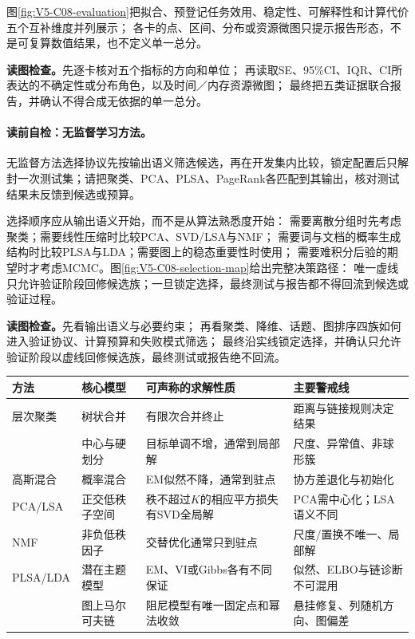 图\ref{fig:V5-C08-evaluation}把拟合、预登记任务效用、稳定性、可解释性和计算代价五个互补维度并列展示；
各卡的点、区间、分布或资源微图只提示报告形态，不是可复算数值结果，也不定义单一总分。

\FloatBarrier
\noindent\textbf{读图检查。}先逐卡核对五个指标的方向和单位；
再读取SE、95\%CI、IQR、CI所表达的不确定性或分布角色，以及时间／内存资源微图；
最终把五类证据联合报告，并确认不得合成无依据的单一总分。

\paragraph{读前自检：无监督学习方法。}无监督方法选择协议先按输出语义筛选候选，再在开发集内比较，锁定配置后只解封一次测试集；请把聚类、PCA、PLSA、PageRank各匹配到其输出，核对测试结果未反馈到候选或预算。\par


选择顺序应从输出语义开始，而不是从算法熟悉度开始：
需要离散分组时先考虑聚类；需要线性压缩时比较PCA、SVD/LSA与NMF；
需要词与文档的概率生成结构时比较PLSA与LDA；需要图上的稳态重要性时使用\PageRank{}；
需要难积分后验的期望时才考虑MCMC。图\ref{fig:V5-C08-selection-map}给出完整决策路径：
唯一虚线只允许验证阶段回修候选族；一旦锁定选择，最终测试与报告都不得回流到候选或验证过程。

\FloatBarrier
\noindent\textbf{读图检查。}先看输出语义与必要约束；
再看聚类、降维、话题、图排序四族如何进入验证协议、计算预算和失败模式筛选；
最终沿实线锁定选择，并确认只允许验证阶段以虚线回修候选族，最终测试或报告绝不回流。

\begin{center}
\small
\begin{tabularx}{\textwidth}{@{}p{}p{}Xp{}@{}}
\toprule
方法 & 核心模型 & 可声称的求解性质 & 主要警戒线 \\
\midrule
层次聚类 & 树状合并 & 有限次合并终止 & 距离与链接规则决定结果 \\
\kMeans{} & 中心与硬划分 & 目标单调不增，通常到局部解 & 尺度、异常值、非球形簇 \\
高斯混合 & 概率混合 & EM似然不降，通常到驻点 & 协方差退化与初始化 \\
PCA/LSA & 正交低秩子空间 & 秩不超过$K$的相应平方损失有SVD全局解 & PCA需中心化；LSA语义不同 \\
NMF & 非负低秩因子 & 交替优化通常只到驻点 & 尺度/置换不唯一、局部解 \\
PLSA/LDA & 潜在主题模型 & EM、VI或Gibbs各有不同保证 & 似然、ELBO与链诊断不可混用 \\
\PageRank{} & 图上马尔可夫链 & 阻尼模型有唯一固定点和幂法收敛 & 悬挂修复、列随机方向、图偏差 \\
\bottomrule
\end{tabularx}
\end{center}


